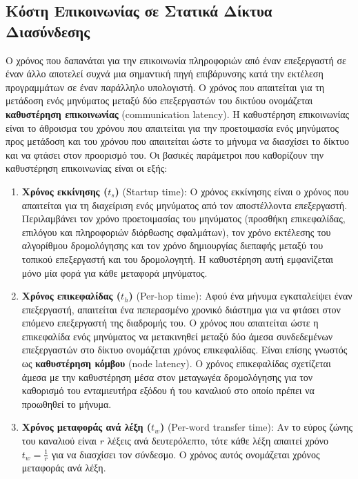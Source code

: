 \documentclass[12pt,a4paper]{article} %
\begin{document}
\subsection{Κόστη Επικοινωνίας σε Στατικά Δίκτυα Διασύνδεσης}
Ο χρόνος που δαπανάται για την επικοινωνία πληροφοριών από έναν επεξεργαστή 
σε έναν άλλο αποτελεί συχνά μια σημαντική πηγή επιβάρυνσης κατά την 
εκτέλεση προγραμμάτων σε έναν παράλληλο υπολογιστή. Ο χρόνος που απαιτείται 
για τη μετάδοση ενός μηνύματος μεταξύ δύο επεξεργαστών του δικτύου 
ονομάζεται \textbf{καθυστέρηση επικοινωνίας}
(communication latency). Η καθυστέρηση 
επικοινωνίας είναι το άθροισμα του χρόνου που απαιτείται για την 
προετοιμασία ενός μηνύματος προς μετάδοση και του χρόνου που απαιτείται 
ώστε το μήνυμα να διασχίσει το δίκτυο και να φτάσει στον προορισμό του. 
Οι βασικές παράμετροι που καθορίζουν την καθυστέρηση επικοινωνίας είναι 
οι εξής:

\begin{enumerate}
\item \textbf{Χρόνος εκκίνησης ($t_s$)} 
(Startup time):
Ο χρόνος εκκίνησης είναι ο χρόνος που απαιτείται για τη διαχείριση ενός 
μηνύματος από τον αποστέλλοντα επεξεργαστή. Περιλαμβάνει τον χρόνο 
προετοιμασίας του μηνύματος (προσθήκη επικεφαλίδας, επιλόγου και 
πληροφοριών διόρθωσης σφαλμάτων), τον χρόνο εκτέλεσης του αλγορίθμου 
δρομολόγησης και τον χρόνο δημιουργίας διεπαφής μεταξύ του τοπικού 
επεξεργαστή και του δρομολογητή. Η καθυστέρηση αυτή εμφανίζεται μόνο μία 
φορά για κάθε μεταφορά μηνύματος.

\item \textbf{Χρόνος επικεφαλίδας ($t_h$)}
(Per-hop time):
Αφού ένα μήνυμα εγκαταλείψει έναν επεξεργαστή, απαιτείται ένα πεπερασμένο 
χρονικό διάστημα για να φτάσει στον επόμενο επεξεργαστή της διαδρομής του. 
Ο χρόνος που απαιτείται ώστε η επικεφαλίδα ενός μηνύματος να μετακινηθεί 
μεταξύ δύο άμεσα συνδεδεμένων επεξεργαστών στο δίκτυο ονομάζεται χρόνος 
επικεφαλίδας. Είναι επίσης γνωστός ως \textbf{καθυστέρηση κόμβου} 
(node latency). Ο χρόνος επικεφαλίδας σχετίζεται 
άμεσα με την καθυστέρηση μέσα στον μεταγωγέα δρομολόγησης για τον 
καθορισμό του ενταμιευτήρα εξόδου ή του καναλιού στο οποίο πρέπει να 
προωθηθεί το μήνυμα.

\item \textbf{Χρόνος μεταφοράς ανά λέξη ($t_w$)}
(Per-word transfer time):
Αν το εύρος ζώνης του καναλιού είναι $r$ λέξεις ανά δευτερόλεπτο, τότε 
κάθε λέξη απαιτεί χρόνο $t_w = \frac{1}{r}$ για να διασχίσει τον σύνδεσμο. 
Ο χρόνος αυτός ονομάζεται χρόνος μεταφοράς ανά λέξη.
\end{enumerate}
\end{document}
